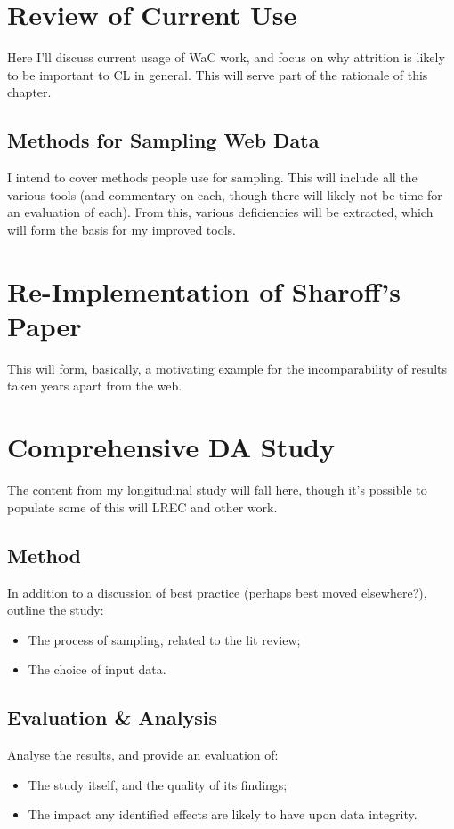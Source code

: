 
\section{Review of Current Use}
Here I'll discuss current usage of WaC work, and focus on why attrition is likely to be important to CL in general.  This will serve part of the rationale of this chapter.

\subsection{Methods for Sampling Web Data}
I intend to cover methods people use for sampling.  This will include all the various tools (and commentary on each, though there will likely not be time for an evaluation of each).  From this, various deficiencies will be extracted, which will form the basis for my improved tools.


\section{Re-Implementation of Sharoff's Paper}
This will form, basically, a motivating example for the incomparability of results taken years apart from the web.



\section{Comprehensive DA Study}
The content from my longitudinal study will fall here, though it's possible to populate some of this will LREC and other work.

\subsection{Method}
In addition to a discussion of best practice (perhaps best moved elsewhere?), outline the study:
\begin{itemize}
	\item The process of sampling, related to the lit review;
	\item The choice of input data.
\end{itemize}


\subsection{Evaluation \& Analysis}
Analyse the results, and provide an evaluation of:
\begin{itemize}
	\item The study itself, and the quality of its findings;
	\item The impact any identified effects are likely to have upon data integrity.
\end{itemize}


